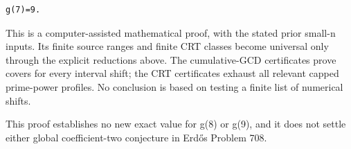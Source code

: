 \documentclass[11pt,a4paper]{article}
\begin{document}
\begin{verbatim}
g(7)=9.
\end{verbatim}

This is a computer-assisted mathematical proof, with the stated prior
small-n inputs. Its finite source ranges and finite CRT classes become
universal only through the explicit reductions above. The cumulative-GCD
certificates prove covers for every interval shift; the CRT certificates
exhaust all relevant capped prime-power profiles. No conclusion is based
on testing a finite list of numerical shifts.

This proof establishes no new exact value for g(8) or g(9), and it does
not settle either global coefficient-two conjecture in Erdős Problem
708.
\end{document}
